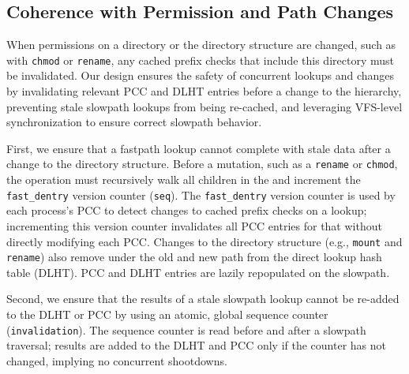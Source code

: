 \subsection{Coherence with Permission and Path Changes}
\label{sec:dcache:rename}

When permissions on a directory or the directory structure are changed, such as with {\tt chmod} or {\tt rename},
any cached prefix checks that include this directory must be invalidated.
Our design  ensures the safety of concurrent lookups and changes by 
invalidating relevant PCC and DLHT entries before a change to the hierarchy,
preventing stale slowpath lookups from being re-cached, and leveraging VFS-level synchronization
to ensure correct slowpath behavior.
  
First, we ensure that a fastpath lookup cannot complete with stale data after a change to the directory structure.
Before a mutation, such as a {\tt rename} or {\tt chmod}, the operation 
must recursively walk all children in the \dcache{} 
and increment the {\tt fast\_dentry} version counter ({\tt seq}). %
The {\tt fast\_dentry} version counter is used by each process's PCC to detect changes to cached prefix checks on a lookup; %
incrementing this version counter invalidates all PCC entries for that \dentry{} without directly modifying
each PCC.  
Changes to the directory structure (e.g., {\tt mount} and {\tt rename}) 
also remove \dentries{} under the old and new path 
from the direct
lookup hash table (DLHT).
PCC and DLHT entries are lazily repopulated on the slowpath.

Second, we ensure that the results of a  stale slowpath lookup cannot be re-added to the DLHT or PCC by using an atomic, global sequence counter ({\tt invalidation}).
The sequence counter is read before and after a slowpath traversal; results are added to the DLHT and PCC only 
if the counter has not changed, implying no concurrent shootdowns.

